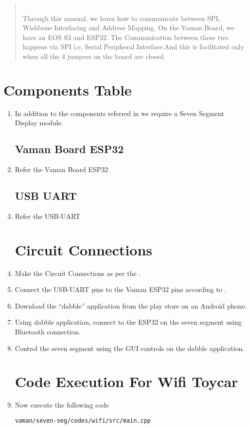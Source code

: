 \begin{abstract}\\
Through this manual, we learn how to communicate between SPI, Wishbone Interfacing and Address Mapping.
On the Vaman Board, we have an EOS S3 and ESP32. The Communication between these two happens via SPI i.e, Serial Peripheral Interface.And this is facilitated only when all the 4 jumpers on the board are closed.
\end{abstract}


\section{Components Table}
\begin{enumerate}[label=\thesection.\arabic*.,ref=\thesection.\theenumi]
\item In addition to the components referred in  we require a Seven Segment Display module.
\subsection{Vaman Board ESP32}
\item Refer the Vaman Board  ESP32 
\subsection{USB UART}
\item Refer the USB-UART 

\section{Circuit Connections}
\item  Make the Circuit Connections as per the . 
\item Connect the USB-UART pins to the Vaman ESP32 pins according to .
\item Download the “dabble” application from the play store on an Android phone.
\item Using dabble application, connect to the ESP32 on the seven segment using Bluetooth connection.
\item Control the seven segment using the GUI controls on the dabble application. 

\section{Code Execution For Wifi Toycar}
\raggedright
\item Now execute the following code
\begin{lstlisting}
vaman/seven-seg/codes/wifi/src/main.cpp
\end{lstlisting}


\end{enumerate}
